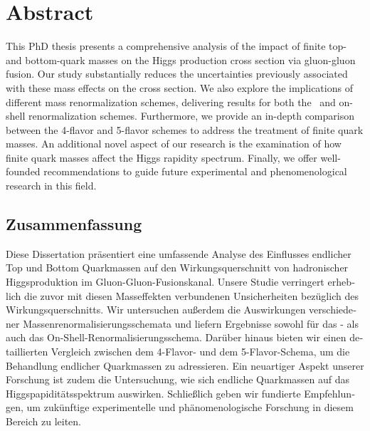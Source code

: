 \begingroup
\let\clearpage\relax
\let\cleardoublepage\relax
\let\cleardoublepage\relax
\chapter*{Abstract}

This PhD thesis presents a comprehensive analysis of the impact of finite top- and bottom-quark masses on the Higgs production cross section via gluon-gluon fusion. Our study substantially reduces the uncertainties previously associated with these mass effects on the cross section. We also explore the implications of different mass renormalization schemes, delivering results for both the \MS\ and on-shell renormalization schemes. Furthermore, we provide an in-depth comparison between the 4-flavor and 5-flavor schemes to address the treatment of finite quark masses. An additional novel aspect of our research is the examination of how finite quark masses affect the Higgs rapidity spectrum. Finally, we offer well-founded recommendations to guide future experimental and phenomenological research in this field.

\newpage
\begin{otherlanguage}{ngerman}
\chapter*{Zusammenfassung}
Diese Dissertation präsentiert eine umfassende Analyse des Einflusses endlicher Top und Bottom Quarkmassen auf den Wirkungsquerschnitt von hadronischer Higgsproduktion im Gluon-Gluon-Fusionskanal. Unsere Studie verringert erheblich die zuvor mit diesen Masseffekten verbundenen Unsicherheiten bezüglich des Wirkungsquerschnitts. Wir untersuchen außerdem die Auswirkungen verschiedener Massenrenormalisierungsschemata und liefern Ergebnisse sowohl für das \MS- als auch das On-Shell-Renormalisierungsschema. Darüber hinaus bieten wir einen detaillierten Vergleich zwischen dem 4-Flavor- und dem 5-Flavor-Schema, um die Behandlung endlicher Quarkmassen zu adressieren. Ein neuartiger Aspekt unserer Forschung ist zudem die Untersuchung, wie sich endliche Quarkmassen auf das Higgspapiditätsspektrum auswirken. Schließlich geben wir fundierte Empfehlungen, um zukünftige experimentelle und phänomenologische Forschung in diesem Bereich zu leiten.

\end{otherlanguage}

\endgroup

\vfill

